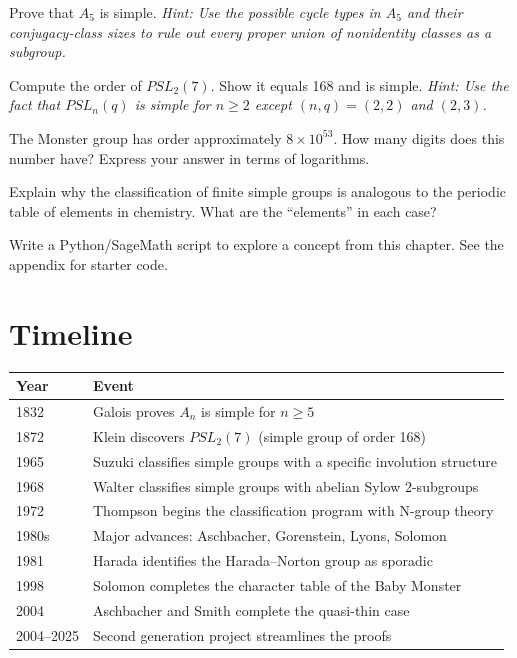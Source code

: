 \begin{exercise}[Basic]
Prove that $A_5$ is simple. \emph{Hint: Use the possible cycle types in $A_5$ and their conjugacy-class sizes to rule out every proper union of nonidentity classes as a subgroup.}
\end{exercise}

\begin{exercise}[Intermediate]
Compute the order of $PSL_2(7)$. Show it equals 168 and is simple. \emph{Hint: Use the fact that $PSL_n(q)$ is simple for $n \geq 2$ except $(n,q) = (2,2)$ and $(2,3)$.}
\end{exercise}

\begin{exercise}[Challenge]
The Monster group has order approximately $8 \times 10^{53}$. How many digits does this number have? Express your answer in terms of logarithms.
\end{exercise}

\begin{exercise}
Explain why the classification of finite simple groups is analogous to the periodic table of elements in chemistry. What are the ``elements'' in each case?
\end{exercise}


\begin{exercise}[Computational]
Write a Python/SageMath script to explore a concept from this chapter. See the appendix for starter code.
\end{exercise}

\section{Timeline}

\begin{tabularx}{\linewidth}{lX}
\toprule
\textbf{Year} & \textbf{Event} \\ \midrule
1832 & Galois proves $A_n$ is simple for $n \geq 5$ \cite{galois1832} \\ 
1872 & Klein discovers $PSL_2(7)$ (simple group of order 168) \cite{klein1872} \\ 
1965 & Suzuki classifies simple groups with a specific involution structure \cite{suzuki1965} \\ 
1968 & Walter classifies simple groups with abelian Sylow 2-subgroups \cite{walter1968} \\ 
1972 & Thompson begins the classification program with N-group theory \cite{thompson1972} \\ 
1980s & Major advances: Aschbacher, Gorenstein, Lyons, Solomon \cite{gls1994} \\ 
1981 & Harada identifies the Harada--Norton group as sporadic \cite{harada1981} \\ 
1998 & Solomon completes the character table of the Baby Monster \cite{solomon1998} \\ 
2004 & Aschbacher and Smith complete the quasi-thin case \cite{aschbacher2004} \\ 
2004--2025 & Second generation project streamlines the proofs \cite{gls1994} \\ \bottomrule
\end{tabularx}

